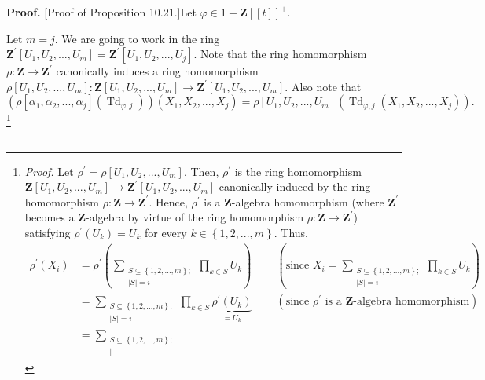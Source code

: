 \documentclass[numbers=enddot,12pt,final,onecolumn,notitlepage]{scrartcl}%
\newenvironment{proof}[1][Proof]{\noindent\textbf{#1.} }{\ \rule{0.5em}{0.5em}}
\begin{document}
\begin{proof}
[Proof of Proposition 10.21.]Let $\varphi\in1+\mathbf{Z}\left[  \left[
t\right]  \right]  ^{+}$.

Let $m=j$. We are going to work in the ring $\mathbf{Z}^{\prime}\left[
U_{1},U_{2},...,U_{m}\right]  =\mathbf{Z}^{\prime}\left[  U_{1},U_{2}%
,...,U_{j}\right]  $. Note that the ring homomorphism $\rho:\mathbf{Z}%
\rightarrow\mathbf{Z}^{\prime}$ canonically induces a ring homomorphism
$\rho\left[  U_{1},U_{2},...,U_{m}\right]  :\mathbf{Z}\left[  U_{1}%
,U_{2},...,U_{m}\right]  \rightarrow\mathbf{Z}^{\prime}\left[  U_{1}%
,U_{2},...,U_{m}\right]  $. Also note that%
\[
\left(  \rho\left[  \alpha_{1},\alpha_{2},...,\alpha_{j}\right]  \left(
\operatorname*{Td}\nolimits_{\varphi,j}\right)  \right)  \left(  X_{1}%
,X_{2},...,X_{j}\right)  =\rho\left[  U_{1},U_{2},...,U_{m}\right]  \left(
\operatorname*{Td}\nolimits_{\varphi,j}\left(  X_{1},X_{2},...,X_{j}\right)
\right)  .
\]
\footnote{\textit{Proof.} Let $\rho^{\prime}=\rho\left[  U_{1},U_{2}%
,...,U_{m}\right]  $. Then, $\rho^{\prime}$ is the ring homomorphism
$\mathbf{Z}\left[  U_{1},U_{2},...,U_{m}\right]  \rightarrow\mathbf{Z}%
^{\prime}\left[  U_{1},U_{2},...,U_{m}\right]  $ canonically induced by the
ring homomorphism $\rho:\mathbf{Z}\rightarrow\mathbf{Z}^{\prime}$. Hence,
$\rho^{\prime}$ is a $\mathbf{Z}$-algebra homomorphism (where $\mathbf{Z}%
^{\prime}$ becomes a $\mathbf{Z}$-algebra by virtue of the ring homomorphism
$\rho:\mathbf{Z}\rightarrow\mathbf{Z}^{\prime}$) satisfying $\rho^{\prime
}\left(  U_{k}\right)  =U_{k}$ for every $k\in\left\{  1,2,...,m\right\}  $.
Thus,%
\begin{align*}
\rho^{\prime}\left(  X_{i}\right)   &  =\rho^{\prime}\left(  \sum
\limits_{\substack{S\subseteq\left\{  1,2,...,m\right\}  ;\\\left\vert
S\right\vert =i}}\prod\limits_{k\in S}U_{k}\right)
\ \ \ \ \ \ \ \ \ \ \left(  \text{since }X_{i}=\sum
\limits_{\substack{S\subseteq\left\{  1,2,...,m\right\}  ;\\\left\vert
S\right\vert =i}}\prod\limits_{k\in S}U_{k}\right) \\
&  =\sum\limits_{\substack{S\subseteq\left\{  1,2,...,m\right\}  ;\\\left\vert
S\right\vert =i}}\prod\limits_{k\in S}\underbrace{\rho^{\prime}\left(
U_{k}\right)  }_{=U_{k}}\ \ \ \ \ \ \ \ \ \ \left(  \text{since }\rho^{\prime
}\text{ is a }\mathbf{Z}\text{-algebra homomorphism}\right) \\
&  =\sum\limits_{\substack{S\subseteq\left\{  1,2,...,m\right\}  ;\\\left\vert
}}
\end{align*}}
\end{proof}
\end{document}
